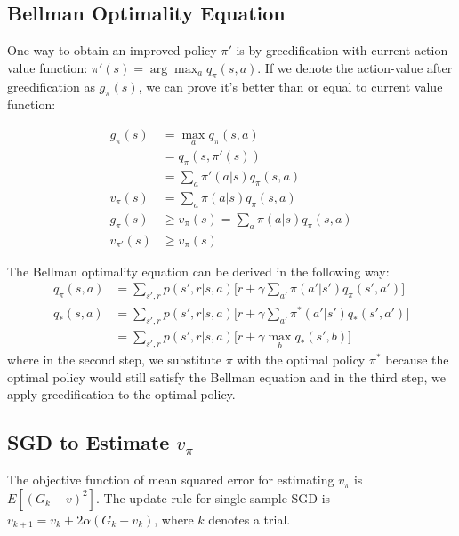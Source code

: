 \documentclass[twoside]{article}
\begin{document}
\subsection{Bellman Optimality Equation}

One way to obtain an improved policy $ \pi' $ is by greedification with current action-value function: $ \pi'(s)=\arg\max_a q_\pi(s,a) $. If we denote the action-value after greedification as $ g_\pi(s) $, we can prove it's better than or equal to current value function:

\begin{align*}
g_\pi(s) &= \max_a q_\pi(s,a)\\
&= q_\pi(s, \pi'(s))\\
&= \sum_a \pi'(a|s) q_\pi(s,a)\\
v_\pi(s) &= \sum_a \pi(a|s) q_\pi(s,a)\\
g_\pi(s) &\ge v_\pi(s) = \sum_a \pi(a|s) q_\pi(s,a)\\
v_{\pi'}(s) &\ge v_\pi(s)
\end{align*}

The Bellman optimality equation can be derived in the following way:
\begin{align*}
q_\pi(s,a) &= \sum_{s',r}p(s', r|s,a)\Big[ r+ \gamma \sum_{a'} \pi(a'|s') q_\pi(s', a') \Big] \\
q_*(s,a) &= \sum_{s',r}p(s', r|s,a)\Big[ r+ \gamma \sum_{a'} \pi^*(a'|s') q_*(s', a') \Big] \\
&= \sum_{s',r}p(s', r|s,a)\Big[ r+ \gamma \max_b q_*(s', b) \Big]
\end{align*}
where in the second step, we substitute $ \pi $ with the optimal policy $ \pi^* $ because the optimal policy would still satisfy the Bellman equation and in the third step, we apply greedification to the optimal policy.

\subsection{SGD to Estimate $v_\pi$}

The objective function of mean squared error for estimating $ v_\pi $ is $E[(G_k - v)^2]$. The update rule for single sample SGD is $ v_{k+1} = v_k + 2\alpha(G_k - v_k) $, where $ k $ denotes a trial.
\end{document}
